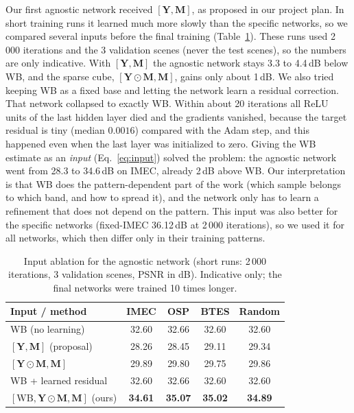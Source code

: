 \documentclass{article}
\def\Y{{\mathbf Y}}
\def\M{{\mathbf M}}
\newcommand{\wb}{\mathrm{WB}}
\begin{document}
Our first agnostic network received $[\Y,\M]$, as proposed in our project
plan. In short training runs it learned much more slowly than the specific
networks, so we compared several inputs before the final training
(Table~\ref{tab:ablation}). These runs used 2\,000 iterations and the 3
validation scenes (never the test scenes), so the numbers are only
indicative. With $[\Y,\M]$ the agnostic network stays 3.3 to 4.4\,dB below
WB, and the sparse cube, $[\Y\odot\M,\M]$, gains only about 1\,dB. We also
tried keeping WB as a fixed base and letting the network learn a residual
correction. That network collapsed to exactly WB. Within about 20
iterations all ReLU units of the last hidden layer died and the gradients
vanished, because the target residual is tiny (median $0.0016$) compared
with the Adam step, and this happened even when the last layer was
initialized to zero. Giving the WB estimate as an \emph{input}
(Eq.~\eqref{eq:input}) solved the problem: the agnostic network went from
28.3 to 34.6\,dB on IMEC, already 2\,dB above WB. Our interpretation is that
WB does the pattern-dependent part of the work (which sample belongs to
which band, and how to spread it), and the network only has to learn a
refinement that does not depend on the pattern. This input was also better
for the specific networks (fixed-IMEC 36.12\,dB at 2\,000 iterations), so we
used it for all networks, which then differ only in their training patterns.

\begin{table}[t]
\centering
\caption{Input ablation for the agnostic network (short runs: 2\,000
iterations, 3 validation scenes, PSNR in dB). Indicative only; the final
networks were trained 10 times longer.}
\label{tab:ablation}
\footnotesize
\setlength{\tabcolsep}{3.5pt}
\begin{tabular}{|l|c|c|c|c|}
\hline
Input / method & IMEC & OSP & BTES & Random \\
\hline
WB (no learning)            & 32.60 & 32.66 & 32.60 & 32.60 \\
\hline
$[\Y,\M]$ (proposal)          & 28.26 & 28.45 & 29.11 & 29.34 \\
$[\Y\odot\M,\M]$             & 29.89 & 29.80 & 29.75 & 29.86 \\
WB + learned residual       & 32.60 & 32.66 & 32.60 & 32.60 \\
$[\wb,\Y\odot\M,\M]$ (ours)  & \textbf{34.61} & \textbf{35.07} & \textbf{35.02} & \textbf{34.89} \\
\hline
\end{tabular}
\end{table}
\end{document}
